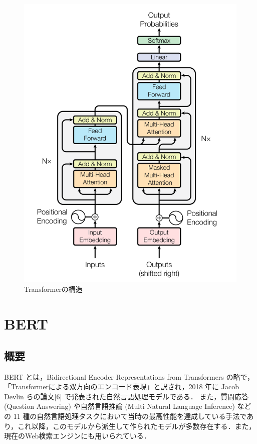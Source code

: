 \begin{figure}[H]%
	\centering
	\includegraphics[width=130mm]{image/transformer.png}
	\caption{Transformerの構造}
	\label{transformer}
\end{figure}

\section{BERT \label{c4s5}}
\subsection{概要}
BERT とは，Bidirectional Encoder Representations from Transformers の略で， 「Transformerによる双方向のエンコード表現」と訳され，2018 年に Jacob Devlin らの論文[6] で発表された自然言語処理モデルである．
また，質問応答 (Question Answering) や自然言語推論 (Multi Natural Language Inference) などの 11 種の自然言語処理タスクにおいて当時の最高性能を達成している手法であり，これ以降，このモデルから派生して作られたモデルが多数存在する．また，現在のWeb検索エンジンにも用いられている．

